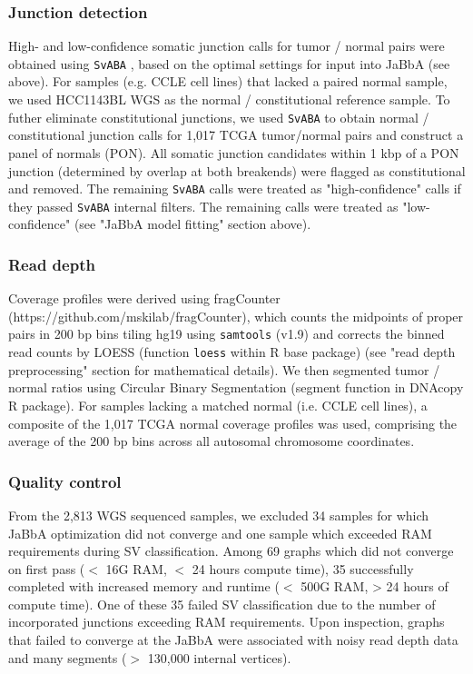 \documentclass[phd,tocprelim]{cornell}
\begin{document}
\subsubsection*{Junction detection}

High- and low-confidence somatic junction calls for tumor / normal pairs were obtained using \texttt{SvABA} \cite{wala2018}, based on the optimal settings for input into JaBbA (see above). For samples (e.g. CCLE cell lines) that lacked a paired normal sample, we used HCC1143BL WGS as the normal / constitutional reference sample.  
To futher eliminate constitutional junctions, we used \texttt{SvABA} to obtain normal / constitutional junction calls for 1,017 TCGA tumor/normal pairs and construct a panel of normals (PON).  All somatic junction candidates within 1 kbp of a PON junction (determined by overlap at both breakends) were flagged as constitutional and removed.  The remaining \texttt{SvABA} calls were treated as "high-confidence" calls if they passed \texttt{SvABA} internal filters.  The remaining calls were treated as "low-confidence" (see "JaBbA model fitting" section above).

\subsubsection*{Read depth} \label{meth:readDepth}
Coverage profiles were derived using fragCounter (https://github.com/mskilab/fragCounter), which counts the midpoints of proper pairs in 200 bp bins tiling hg19 using \texttt{samtools} (v1.9) and corrects the binned read counts by LOESS (function \texttt{loess} within R base package) (see "read depth preprocessing" section for mathematical details). We then segmented tumor / normal ratios using Circular Binary Segmentation \cite{olshen2004} (segment function in DNAcopy R package). For samples lacking a matched normal (i.e. CCLE cell lines), a composite of the 1,017 TCGA normal coverage profiles was used, comprising the average of the 200 bp bins across all autosomal chromosome coordinates.  

\subsubsection*{Quality control}
From the 2,813 WGS sequenced samples, we excluded 34 samples for which JaBbA optimization did not converge and one sample which exceeded RAM requirements during SV classification. Among 69 graphs which did not converge on first pass ($<$ 16G RAM, $<$ 24 hours compute time), 35 successfully completed with increased memory and runtime ($<$ 500G RAM, > 24 hours of compute time).  One of these 35 failed SV classification due to the number of incorporated junctions exceeding RAM requirements.  Upon inspection, graphs that failed to converge at the JaBbA were associated with noisy read depth data and many segments ($>$ 130,000 internal vertices).
\end{document}
